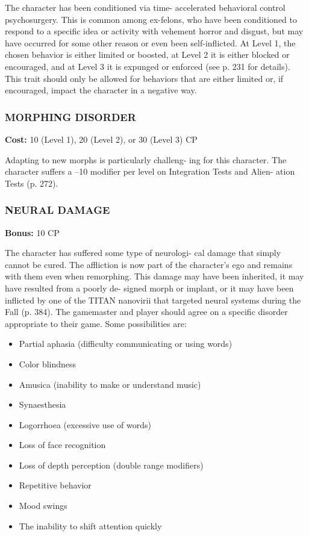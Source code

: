 The character has been conditioned via time-
accelerated behavioral control psychosurgery. This is
common among ex-felons, who have been conditioned
to respond to a specific idea or activity with vehement
horror and disgust, but may have occurred for some
other reason or even been self-inflicted. At Level 1, the
chosen behavior is either limited or boosted, at Level
2 it is either blocked or encouraged, and at Level 3 it
is expunged or enforced (see p. 231 for details). This
trait should only be allowed for behaviors that are
either limited or, if encouraged, impact the character
in a negative way.

\subsubsection{MORPHING DISORDER}
\textbf{Cost:} 10 (Level 1), 20 (Level 2), or 30 (Level 3) CP

Adapting to new morphs is particularly challeng-
ing for this character. The character suffers a –10
modifier per level on Integration Tests and Alien-
ation Tests (p. 272).

\subsubsection{NEURAL DAMAGE}
\textbf{Bonus:} 10 CP

The character has suffered some type of neurologi-
cal damage that simply cannot be cured. The affliction
is now part of the character’s ego and remains with
them even when remorphing. This damage may have
been inherited, it may have resulted from a poorly de-
signed morph or implant, or it may have been inflicted
by one of the TITAN nanovirii that targeted neural
systems during the Fall (p. 384). The gamemaster and
player should agree on a specific disorder appropriate
to their game. Some possibilities are:

\begin{itemize}
\item Partial aphasia (difficulty communicating or
using words)
\item Color blindness
\item Amusica (inability to make or understand music)
\item Synaesthesia
\item Logorrhoea (excessive use of words)
\item Loss of face recognition
\item Loss of depth perception (double range
modifiers)
\item Repetitive behavior
\item Mood swings
\item The inability to shift attention quickly
\end{itemize}

